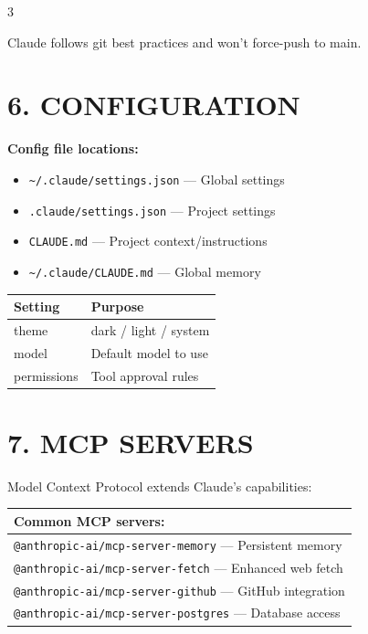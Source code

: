 \documentclass[landscape,11pt]{article}
\begin{document}
\begin{multicols}{3}
\vspace{2mm}
\begin{tcolorbox}[colback=BrickRed!8, colframe=BrickRed, boxsep=2pt, arc=1pt, fontupper=\small\itshape]
Claude follows git best practices and won't force-push to main.
\end{tcolorbox}

\section*{\textcolor{claudegray}{6. CONFIGURATION}}

\textbf{Config file locations:}
\begin{itemize}
  \setlength{\itemsep}{0pt}
  \item \texttt{\textasciitilde/.claude/settings.json} — Global settings
  \item \texttt{.claude/settings.json} — Project settings
  \item \texttt{CLAUDE.md} — Project context/instructions
  \item \texttt{\textasciitilde/.claude/CLAUDE.md} — Global memory
\end{itemize}

\vspace{2mm}
\renewcommand{\arraystretch}{1.15}
\begin{tabularx}{\linewidth}{@{}>{\ttfamily\small}l>{\raggedright\arraybackslash}X@{}}
\normalfont\textbf{Setting} & \textbf{Purpose}\\
\hline
theme & dark / light / system\\
model & Default model to use\\
permissions & Tool approval rules\\
\end{tabularx}
\renewcommand{\arraystretch}{1}

\section*{\textcolor{Cerulean}{7. MCP SERVERS}}
Model Context Protocol extends Claude's capabilities:

\renewcommand{\arraystretch}{1.15}
\begin{tabularx}{\linewidth}{@{}>{\raggedright\arraybackslash}X@{}}
\textbf{Common MCP servers:}\\
\hline
\texttt{@anthropic-ai/mcp-server-memory} — Persistent memory\\
\texttt{@anthropic-ai/mcp-server-fetch} — Enhanced web fetch\\
\texttt{@anthropic-ai/mcp-server-github} — GitHub integration\\
\texttt{@anthropic-ai/mcp-server-postgres} — Database access\\
\end{tabularx}
\renewcommand{\arraystretch}{1}


\end{multicols}
\end{document}

